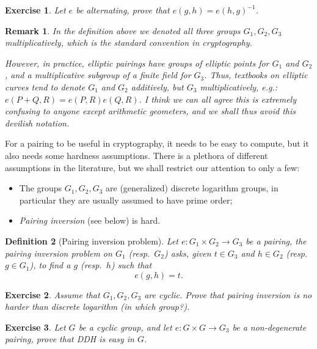 \documentclass{article}
\newtheorem{ex}{Exercise}
\newtheorem{defi}{Definition}
\newtheorem{rk}[defi]{Remark}
\begin{document}
\begin{ex}
  Let $e$ be alternating, prove that $e(g,h) = e(h,g)^{-1}$.
\end{ex}

\begin{rk}
  \label{rk:additive}
  In the definition above we denoted all three groups $G_1,G_2,G_3$
  multiplicatively, which is the standard convention in cryptography.

  However, in practice, elliptic pairings have groups of elliptic
  points for $G_1$ and $G_2$, and a multiplicative subgroup of a
  finite field for $G_3$.  Thus, textbooks on elliptic curves tend to
  denote $G_1$ and $G_2$ additively, but $G_3$ multiplicatively, e.g.:
  $e(P+Q,R) = e(P,R)e(Q,R)$.  I think we can all agree this is
  extremely confusing to anyone except arithmetic geometers, and we
  shall thus avoid this devilish notation.
\end{rk}

For a pairing to be useful in cryptography, it needs to be easy to
compute, but it also needs some hardness assumptions.  There is a
plethora of different assumptions in the literature, but we shall
restrict our attention to only a few:
\begin{itemize}
\item The groups $G_1,G_2,G_3$ are (generalized) discrete logarithm
  groups, in particular they are usually assumed to have prime order;
\item \emph{Pairing inversion} (see below) is hard.
\end{itemize}

\begin{defi}[Pairing inversion problem]
  Let $e:G_1\times G_2 \to G_3$ be a pairing, the \emph{pairing
    inversion} problem on $G_1$ (resp.\ $G_2$) asks, given $t\in G_3$
  and $h\in G_2$ (resp.\ $g\in G_1$), to find a $g$ (resp.\ $h$) such
  that
  \[e(g,h) = t.\]
\end{defi}

\begin{ex}
  \label{ex:inversion}
  Assume that $G_1,G_2,G_3$ are cyclic.  Prove that pairing inversion
  is no harder than discrete logarithm (in which group?).
\end{ex}

\begin{ex}
  Let $G$ be a cyclic group, and let $e:G\times G\to G_3$ be a
  non-degenerate pairing, prove that DDH is easy in $G$.
\end{ex}
\end{document}
